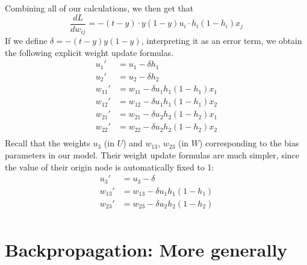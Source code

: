 \documentclass[12pt,letterpaper]{book}
\theoremstyle{definition}
\begin{document}
  Combining all of our calculations, we then get that 
  \[
    \frac{dL}{dw_{ij}}= -(t - y) \cdot y(1 - y)u_i \cdot h_i(1 - h_i)x_j
  \]
  If we define $\delta = -(t - y)y(1 - y)$, interpreting it as an error term,
  we obtain the following explicit weight update formulas.
  \begin{align}
    u_1' &= u_1 - \delta h_1\\
    u_2' &= u_2 - \delta h_2\\
    w_{11}' &= w_{11} - \delta u_1h_1(1 - h_1)x_1\\
    w_{12}' &= w_{12} - \delta u_1h_1(1 - h_1)x_2\\
    w_{21}' &= w_{21} - \delta u_2h_2(1 - h_2)x_1\\
    w_{22}' &= w_{22} - \delta u_2h_2(1 - h_2)x_2\\
  \end{align}
  Recall that the weights $u_3$ (in $U$) and $w_{13}$, $w_{23}$ (in $W$) 
  corresponding to the bias parameters in our model. Their weight update formulas are much simpler, 
  since the value of their origin node is automatically fixed to 1:
  \begin{align}
    u_3' &= u_3 - \delta \\
    w_{13}' &= w_{13} - \delta u_1h_1(1 - h_1)\\
    w_{23}' &= w_{23} - \delta u_2h_2(1 - h_2)\\
  \end{align}

  

  
  \section{Backpropagation: More generally}
\end{document}
